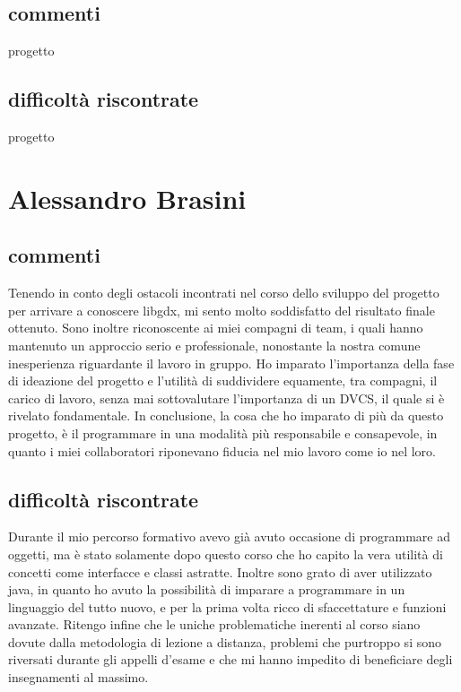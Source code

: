 \documentclass[a4paper,12pt]{report}
\begin{document}
\subsection{commenti}
progetto 
\subsection{difficoltà riscontrate}
progetto 
\newpage

\section{Alessandro Brasini}
\subsection{commenti}
Tenendo in conto degli ostacoli incontrati nel corso dello sviluppo del progetto per arrivare a conoscere libgdx, mi sento molto soddisfatto del risultato finale ottenuto.
Sono inoltre riconoscente ai miei compagni di team, i quali hanno mantenuto un approccio serio e professionale, nonostante la nostra comune inesperienza riguardante il lavoro in gruppo.
Ho imparato l'importanza della fase di ideazione del progetto e l'utilità di suddividere equamente, tra compagni, il carico di lavoro, senza mai sottovalutare l'importanza di un DVCS, il quale si è rivelato fondamentale.
In conclusione, la cosa che ho imparato di più da questo progetto, è il programmare in una modalità più responsabile e consapevole, in quanto i miei collaboratori riponevano fiducia nel mio lavoro come io nel loro.
\subsection{difficoltà riscontrate}
Durante il mio percorso formativo avevo già avuto occasione di programmare ad oggetti, ma è stato solamente dopo questo corso che ho capito la vera utilità di concetti come interfacce e classi astratte. Inoltre sono grato di aver utilizzato java, in quanto ho avuto la possibilità di imparare a programmare in un linguaggio del tutto nuovo, e per la prima volta ricco di sfaccettature e funzioni avanzate.
Ritengo infine che le uniche problematiche inerenti al corso siano dovute dalla metodologia di lezione a distanza, problemi che purtroppo si sono riversati durante gli appelli d'esame e che mi hanno impedito di beneficiare degli insegnamenti al massimo.
\newpage
\end{document}
